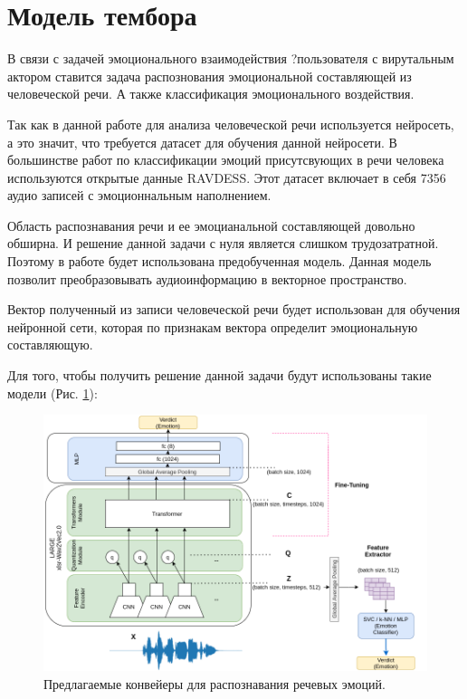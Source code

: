 
\section{Модель тембора}

В связи с задачей эмоционального взаимодействия ?пользователя с вирутальным актором
ставится задача распознования эмоциональной составляющей из человеческой речи. А также
классификация эмоционального воздействия.

Так как в данной работе для анализа человеческой речи используется нейросеть, а это значит,
что требуется датасет для обучения данной нейросети.
В большинстве работ по классификации эмоций присутсвующих в речи человека используются
открытые данные RAVDESS. Этот датасет включает в себя 7356 аудио записей с эмоционнальным наполнением.

Область распознавания речи и ее эмоцианальной составляющей довольно обширна. И решение данной задачи с нуля
является слишком трудозатратной. Поэтому в работе будет использована предобученная модель.
Данная модель позволит преобразовывать аудиоинформацию в векторное пространство.

Вектор полученный из записи человеческой речи будет использован для обучения нейронной сети,
которая по признакам вектора определит эмоциональную составляющую.

Для того, чтобы получить решение данной задачи будут использованы такие модели (Рис. \ref{pic:normpic}):


\begin{figure}[h]
\includegraphics[width=0.75\columnwidth]{./img/normpic.png}
\centering
\caption{Предлагаемые конвейеры для распознавания речевых эмоций.}
\label{pic:normpic}
\end{figure}



